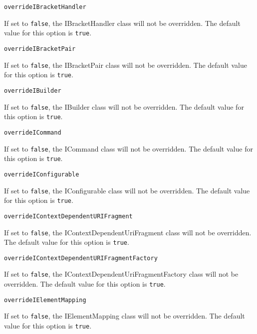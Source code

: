 \noindent\texttt{overrideIBracketHandler}
\begin{myindentpar}{1cm}
If set to \texttt{false}, the IBracketHandler class will not be overridden. The default value for this option is \texttt{true}.
\end{myindentpar}

\noindent\texttt{overrideIBracketPair}
\begin{myindentpar}{1cm}
If set to \texttt{false}, the IBracketPair class will not be overridden. The default value for this option is \texttt{true}.
\end{myindentpar}

\noindent\texttt{overrideIBuilder}
\begin{myindentpar}{1cm}
If set to \texttt{false}, the IBuilder class will not be overridden. The default value for this option is \texttt{true}.
\end{myindentpar}

\noindent\texttt{overrideICommand}
\begin{myindentpar}{1cm}
If set to \texttt{false}, the ICommand class will not be overridden. The default value for this option is \texttt{true}.
\end{myindentpar}

\noindent\texttt{overrideIConfigurable}
\begin{myindentpar}{1cm}
If set to \texttt{false}, the IConfigurable class will not be overridden. The default value for this option is \texttt{true}.
\end{myindentpar}

\noindent\texttt{overrideIContextDependentURIFragment}
\begin{myindentpar}{1cm}
If set to \texttt{false}, the IContextDependentUriFragment class will not be overridden. The default value for this option is \texttt{true}.
\end{myindentpar}

\noindent\texttt{overrideIContextDependentURIFragmentFactory}
\begin{myindentpar}{1cm}
If set to \texttt{false}, the IContextDependentUriFragmentFactory class will not be overridden. The default value for this option is \texttt{true}.
\end{myindentpar}

\noindent\texttt{overrideIElementMapping}
\begin{myindentpar}{1cm}
If set to \texttt{false}, the IElementMapping class will not be overridden. The default value for this option is \texttt{true}.
\end{myindentpar}


